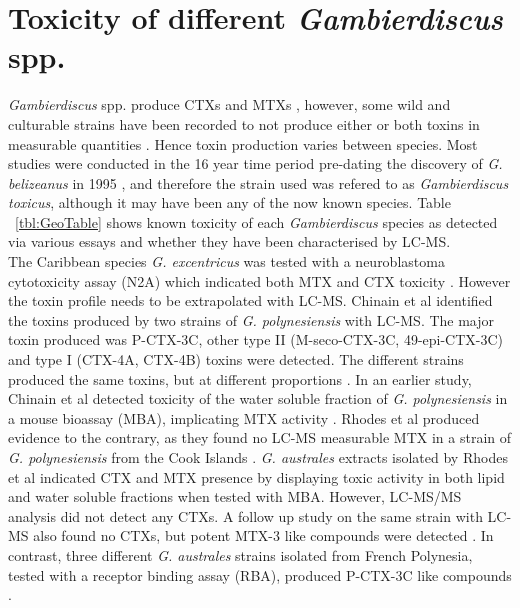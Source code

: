 \documentclass[12pt]{article}
\begin{document}
\section{Toxicity of different \emph{Gambierdiscus} spp.}
\emph{Gambierdiscus} spp. produce CTXs and MTXs \cite{murata1990structures,holmes1991strain,satake1993structure,holmes1994purification,satake1996isolation}, however, some wild and culturable strains have been recorded to not produce either or both toxins in measurable quantities \cite{gillespie1985significance,holmes1990toxicity}. Hence toxin production varies between species. Most studies were conducted in the 16 year time period pre-dating the discovery of \emph{G. belizeanus} in 1995 \cite{faust1995observation}, and therefore the strain used was refered to as \emph{Gambierdiscus toxicus}, although it may have been any of the now known species. Table ~\ref{tbl:GeoTable} shows known toxicity of each \emph{Gambierdiscus} species as detected via various essays and whether they have been characterised by LC-MS. \\

The Caribbean species \emph{G. excentricus} was tested with a neuroblastoma cytotoxicity assay (N2A) which indicated both MTX and CTX toxicity \cite{fraga2011gambierdiscus}. However the toxin profile needs to be extrapolated with LC-MS.
Chinain et al identified the toxins produced by two strains of \emph{G. polynesiensis} with LC-MS. The major toxin produced was P-CTX-3C, other type II (M-seco-CTX-3C, 49-epi-CTX-3C) and type I (CTX-4A, CTX-4B) toxins were detected. The different strains produced the same toxins, but at different proportions \cite{chinain2010growth}. In an earlier study, Chinain et al detected toxicity of the water soluble fraction of \emph{G. polynesiensis} in a mouse bioassay (MBA), implicating MTX activity \cite{chinain1999morphology}. Rhodes et al produced evidence to the contrary, as they found no LC-MS measurable MTX in a strain of \emph{G. polynesiensis} from the Cook Islands \cite{rhodes2014production}.
\emph{G. australes} extracts isolated by Rhodes et al indicated CTX and MTX presence by displaying toxic activity in both lipid and water soluble fractions when tested with MBA. However, LC-MS/MS analysis did not detect any CTXs. A follow up study on the same strain with LC-MS also found no CTXs, but potent MTX-3 like compounds were detected \cite{rhodes2014production,rhodes2010toxic}. In contrast, three different \emph{G. australes} strains isolated from French Polynesia, tested with a receptor binding assay (RBA), produced P-CTX-3C like compounds \cite{chinain2010growth}.\\
\end{document}
